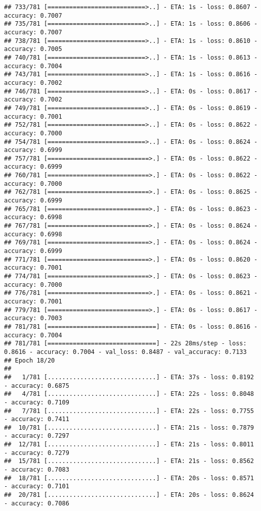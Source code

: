 \documentclass[
]{article}
\begin{document}
\begin{verbatim}
## 733/781 [===========================>..] - ETA: 1s - loss: 0.8607 - accuracy: 0.7007
## 735/781 [===========================>..] - ETA: 1s - loss: 0.8606 - accuracy: 0.7007
## 738/781 [===========================>..] - ETA: 1s - loss: 0.8610 - accuracy: 0.7005
## 740/781 [===========================>..] - ETA: 1s - loss: 0.8613 - accuracy: 0.7004
## 743/781 [===========================>..] - ETA: 1s - loss: 0.8616 - accuracy: 0.7002
## 746/781 [===========================>..] - ETA: 0s - loss: 0.8617 - accuracy: 0.7002
## 749/781 [===========================>..] - ETA: 0s - loss: 0.8619 - accuracy: 0.7001
## 752/781 [===========================>..] - ETA: 0s - loss: 0.8622 - accuracy: 0.7000
## 754/781 [===========================>..] - ETA: 0s - loss: 0.8624 - accuracy: 0.6999
## 757/781 [============================>.] - ETA: 0s - loss: 0.8622 - accuracy: 0.6999
## 760/781 [============================>.] - ETA: 0s - loss: 0.8622 - accuracy: 0.7000
## 762/781 [============================>.] - ETA: 0s - loss: 0.8625 - accuracy: 0.6999
## 765/781 [============================>.] - ETA: 0s - loss: 0.8623 - accuracy: 0.6998
## 767/781 [============================>.] - ETA: 0s - loss: 0.8624 - accuracy: 0.6998
## 769/781 [============================>.] - ETA: 0s - loss: 0.8624 - accuracy: 0.6999
## 771/781 [============================>.] - ETA: 0s - loss: 0.8620 - accuracy: 0.7001
## 774/781 [============================>.] - ETA: 0s - loss: 0.8623 - accuracy: 0.7000
## 776/781 [============================>.] - ETA: 0s - loss: 0.8621 - accuracy: 0.7001
## 779/781 [============================>.] - ETA: 0s - loss: 0.8617 - accuracy: 0.7003
## 781/781 [==============================] - ETA: 0s - loss: 0.8616 - accuracy: 0.7004
## 781/781 [==============================] - 22s 28ms/step - loss: 0.8616 - accuracy: 0.7004 - val_loss: 0.8487 - val_accuracy: 0.7133
## Epoch 18/20
## 
##   1/781 [..............................] - ETA: 37s - loss: 0.8192 - accuracy: 0.6875
##   4/781 [..............................] - ETA: 22s - loss: 0.8048 - accuracy: 0.7109
##   7/781 [..............................] - ETA: 22s - loss: 0.7755 - accuracy: 0.7411
##  10/781 [..............................] - ETA: 21s - loss: 0.7879 - accuracy: 0.7297
##  12/781 [..............................] - ETA: 21s - loss: 0.8011 - accuracy: 0.7279
##  15/781 [..............................] - ETA: 21s - loss: 0.8562 - accuracy: 0.7083
##  18/781 [..............................] - ETA: 20s - loss: 0.8571 - accuracy: 0.7101
##  20/781 [..............................] - ETA: 20s - loss: 0.8624 - accuracy: 0.7086

\end{verbatim}
\end{document}

